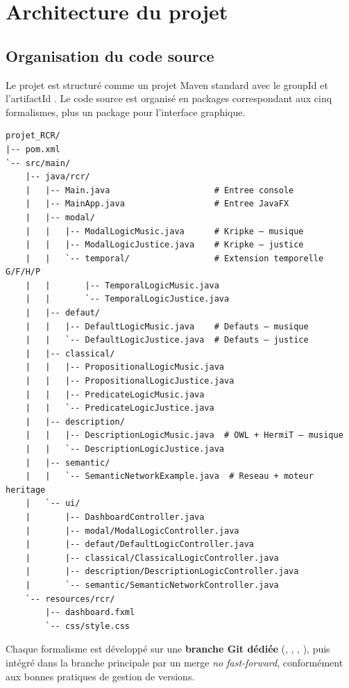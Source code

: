 \chapter{Architecture du projet}

\section{Organisation du code source}

Le projet est structuré comme un projet Maven standard avec le groupId
 et l'artifactId .
Le code source est organisé en packages correspondant aux cinq formalismes,
plus un package  pour l'interface graphique.

\begin{lstlisting}[style=dl, caption={Arborescence du projet Maven}]
projet_RCR/
|-- pom.xml
`-- src/main/
    |-- java/rcr/
    |   |-- Main.java                     # Entree console
    |   |-- MainApp.java                  # Entree JavaFX
    |   |-- modal/
    |   |   |-- ModalLogicMusic.java      # Kripke — musique
    |   |   |-- ModalLogicJustice.java    # Kripke — justice
    |   |   `-- temporal/                 # Extension temporelle G/F/H/P
    |   |       |-- TemporalLogicMusic.java
    |   |       `-- TemporalLogicJustice.java
    |   |-- defaut/
    |   |   |-- DefaultLogicMusic.java    # Defauts — musique
    |   |   `-- DefaultLogicJustice.java  # Defauts — justice
    |   |-- classical/
    |   |   |-- PropositionalLogicMusic.java
    |   |   |-- PropositionalLogicJustice.java
    |   |   |-- PredicateLogicMusic.java
    |   |   `-- PredicateLogicJustice.java
    |   |-- description/
    |   |   |-- DescriptionLogicMusic.java  # OWL + HermiT — musique
    |   |   `-- DescriptionLogicJustice.java
    |   |-- semantic/
    |   |   `-- SemanticNetworkExample.java  # Reseau + moteur heritage
    |   `-- ui/
    |       |-- DashboardController.java
    |       |-- modal/ModalLogicController.java
    |       |-- defaut/DefaultLogicController.java
    |       |-- classical/ClassicalLogicController.java
    |       |-- description/DescriptionLogicController.java
    |       `-- semantic/SemanticNetworkController.java
    `-- resources/rcr/
        |-- dashboard.fxml
        `-- css/style.css
\end{lstlisting}

Chaque formalisme est développé sur une \textbf{branche Git dédiée}
(, , ,
), puis intégré dans la branche principale
 par un merge \emph{no fast-forward}, conformément aux
bonnes pratiques de gestion de versions.

